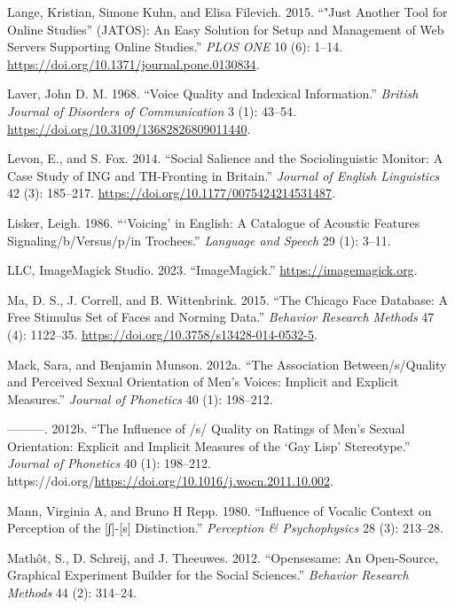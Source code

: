 \documentclass[
  letterpaper,
  DIV=11,
  numbers=noendperiod]{scrartcl}
\newlength{\cslhangindent}
\newenvironment{CSLReferences}[2] %
 {\begin{list}{}{%
  \setlength{\itemindent}{0pt}
  \setlength{\leftmargin}{0pt}
  \setlength{\parsep}{0pt}
  \ifodd #1
   \setlength{\leftmargin}{\cslhangindent}
   \setlength{\itemindent}{-1\cslhangindent}
  \fi
  \setlength{\itemsep}{#2\baselineskip}}}
 {\end{list}}
\begin{document}
\begin{CSLReferences}{1}{0}
Lange, Kristian, Simone Kuhn, and Elisa Filevich. 2015. {``"Just Another
Tool for Online Studies'' (JATOS): An Easy Solution for Setup and
Management of Web Servers Supporting Online Studies.''} \emph{PLOS ONE}
10 (6): 1--14. \url{https://doi.org/10.1371/journal.pone.0130834}.

Laver, John D. M. 1968. {``Voice Quality and Indexical Information.''}
\emph{British Journal of Disorders of Communication} 3 (1): 43--54.
\url{https://doi.org/10.3109/13682826809011440}.

Levon, E., and S. Fox. 2014. {``Social Salience and the Sociolinguistic
Monitor: {A} Case Study of {ING} and {TH}-Fronting in Britain.''}
\emph{Journal of English Linguistics} 42 (3): 185--217.
\url{https://doi.org/10.1177/0075424214531487}.

Lisker, Leigh. 1986. {``{`Voicing'} in English: A Catalogue of Acoustic
Features Signaling/b/Versus/p/in Trochees.''} \emph{Language and Speech}
29 (1): 3--11.

LLC, ImageMagick Studio. 2023. {``ImageMagick.''}
\url{https://imagemagick.org}.

Ma, D. S., J. Correll, and B. Wittenbrink. 2015. {``The Chicago Face
Database: A Free Stimulus Set of Faces and Norming Data.''}
\emph{Behavior Research Methods} 47 (4): 1122--35.
\url{https://doi.org/10.3758/s13428-014-0532-5}.

Mack, Sara, and Benjamin Munson. 2012a. {``The Association
Between/s/Quality and Perceived Sexual Orientation of Men's Voices:
Implicit and Explicit Measures.''} \emph{Journal of Phonetics} 40 (1):
198--212.

---------. 2012b. {``The Influence of /s/ Quality on Ratings of Men's
Sexual Orientation: Explicit and Implicit Measures of the {`Gay Lisp'}
Stereotype.''} \emph{Journal of Phonetics} 40 (1): 198--212.
https://doi.org/\url{https://doi.org/10.1016/j.wocn.2011.10.002}.

Mann, Virginia A, and Bruno H Repp. 1980. {``Influence of Vocalic
Context on Perception of the {[}∫{]}-{[}s{]} Distinction.''}
\emph{Perception \& Psychophysics} 28 (3): 213--28.

Mathôt, S., D. Schreij, and J. Theeuwes. 2012. {``Opensesame: An
Open-Source, Graphical Experiment Builder for the Social Sciences.''}
\emph{Behavior Research Methods} 44 (2): 314--24.


\end{CSLReferences}
\end{document}
